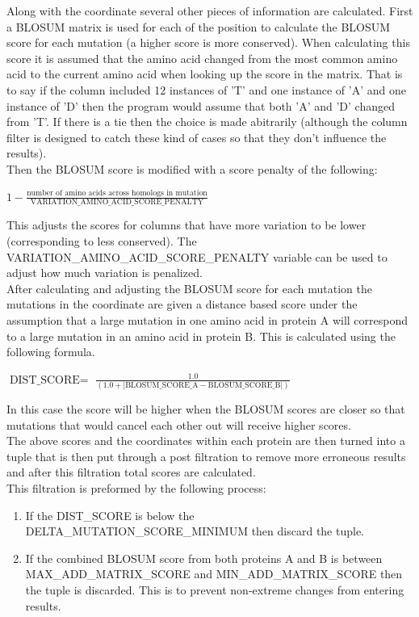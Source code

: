 \documentclass[11pt]{article}
\begin{document}
Along with the coordinate several other pieces of information are
calculated. First a BLOSUM matrix is used for each of the position to
calculate the BLOSUM score for each mutation (a higher score is more
conserved). When calculating this score it is assumed that the amino
acid changed from the most common amino acid to the current amino acid
when looking up the score in the matrix. That is to say if the column
included 12 instances of 'T' and one instance of 'A' and one instance
of 'D' then the program would assume that both 'A' and 'D' changed
from 'T'. If there is a tie then the choice is made abitrarily
(although the column filter is designed to catch these kind of cases
so that they don't influence the results). \\

Then the BLOSUM score is modified with a score penalty of the
following:
\begin{center}
  $1 - \frac{\mbox{number of amino acids across homologs in mutation}}{\mbox{VARIATION\_AMINO\_ACID\_SCORE\_PENALTY}}$
\end{center}
This adjusts the scores for columns that have more variation to be
lower (corresponding to less conserved). The
VARIATION\_AMINO\_ACID\_SCORE\_PENALTY variable can be used to adjust
how much variation is penalized. \\

After calculating and adjusting the BLOSUM score for each mutation the
mutations in the coordinate are given a distance based score under the
assumption that a large mutation in one amino acid in protein A will
correspond to a large mutation in an amino acid in protein B. This is
calculated using the following formula. \\
\begin{center}
  $\mbox{DIST\_SCORE} = $
  $\frac{1.0}{(1.0 + |\mbox{BLOSUM\_SCORE\_A} - \mbox{BLOSUM\_SCORE\_B}|)}$
\end{center}
In this case the score will be higher when the BLOSUM scores are
closer so that mutations that would cancel each other out will receive
higher scores. \\

The above scores and the coordinates within each protein are then
turned into a tuple that is then put through a post filtration to
remove more erroneous results and after this filtration total scores
are calculated. \\

This filtration is preformed by the following process:
\begin{enumerate}
  \item If the DIST\_SCORE is below the
    DELTA\_MUTATION\_SCORE\_MINIMUM then discard the tuple.
  \item If the combined BLOSUM score from both proteins A and B is
    between MAX\_ADD\_MATRIX\_SCORE and MIN\_ADD\_MATRIX\_SCORE then
    the tuple is discarded. This is to prevent non-extreme changes
    from entering results.
\end{enumerate}
\end{document}
